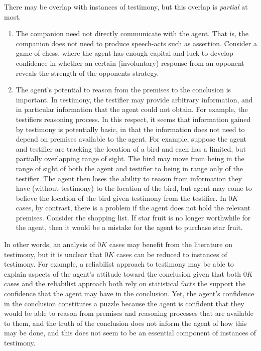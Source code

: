 \documentclass[10pt]{article}
\begin{document}
There may be overlap with instances of testimony, but this overlap is \emph{partial} at most.
\begin{enumerate}
\item The companion need not directly communicate with the agent.
  That is, the companion does not need to produce speech-acts such as assertion.
  Consider a game of chess, where the agent has enough capital and luck to develop confidence in whether an certain (involuntary) response from an opponent reveals the strength of the opponents strategy.
\item The agent's potential to reason from the premises to the conclusion is important.
  In testimony, the testifier may provide arbitrary information, and in particular information that the agent could not obtain.
  For example, the testifiers reasoning process.
  In this respect, it seems that information gained by testimony is potentially basic, in that the information does not need to depend on premises available to the agent.
  For example, suppose the agent and testifier are tracking the location of a bird and each has a limited, but partially overlapping range of sight.
  The bird may move from being in the range of sight of both the agent and testifier to being in range only of the testifier.
  The agent then loses the ability to reason from information they have (without testimony) to the location of the bird, but agent may come to believe the location of the bird given testimony from the testifier.
  In \(0K\) cases, by contrast, there is a problem if the agent does not hold the relevant premises.
  Consider the shopping list.
  If star fruit is no longer worthwhile for the agent, then it would be a mistake for the agent to purchase star fruit.
\end{enumerate}

In other words, an analysis of \(0K\) cases may benefit from the literature on testimony, but it is unclear that \(0K\) cases can be reduced to instances of testimony.
For example, a reliabilist approach to testimony may be able to explain aspects of the agent's attitude toward the conclusion given that both \(0K\) cases and the reliabilist approach both rely on statistical facts the support the confidence that the agent may have in the conclusion.
Yet, the agent's confidence in the conclusion constitutes a puzzle because the agent is confident that they would be able to reason from premises and reasoning processes that are available to them, and the truth of the conclusion does not inform the agent of how this may be done, and this does not seem to be an essential component of instances of testimony.
\end{document}
